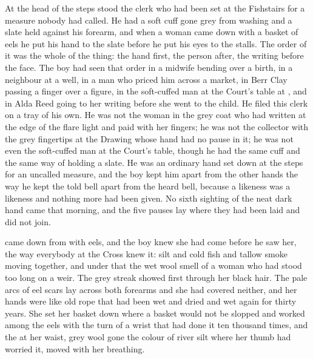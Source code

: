 At the head of the steps stood the clerk who had been set at the Fishstairs for a measure nobody had called. He had a soft cuff gone grey from washing and a slate held against his forearm, and when a woman came down with a basket of eels he put his hand to the slate before he put his eyes to the stalls. The order of it was the whole of the thing: the hand first, the person after, the writing before the face. The boy had seen that order in a midwife bending over a birth, in a neighbour at a well, in a man who priced him across a market, in Berr Clay passing a finger over a figure, in the soft-cuffed man at the Court's table at , and in Alda Reed going to her writing before she went to the child. He filed this clerk on a tray of his own. He was not the woman in the grey coat who had written at the edge of the flare light and paid with her fingers; he was not the collector with the grey fingertips at the Drawing whose hand had no pause in it; he was not even the soft-cuffed man at the Court's table, though he had the same cuff and the same way of holding a slate. He was an ordinary hand set down at the steps for an uncalled measure, and the boy kept him apart from the other hands the way he kept the told bell apart from the heard bell, because a likeness was a likeness and nothing more had been given. No sixth sighting of the neat dark hand came that morning, and the five pauses lay where they had been laid and did not join.

\scenebreak

 came down from  with eels, and the boy knew she had come before he saw her, the way everybody at the Cross knew it: silt and cold fish and tallow smoke moving together, and under that the wet wool smell of a woman who had stood too long on a weir. The grey streak showed first through her black hair. The pale arcs of eel scars lay across both forearms and she had covered neither, and her hands were like old rope that had been wet and dried and wet again for thirty years. She set her basket down where a basket would not be slopped and worked among the eels with the turn of a wrist that had done it ten thousand times, and the  at her waist, grey wool gone the colour of river silt where her thumb had worried it, moved with her breathing.

